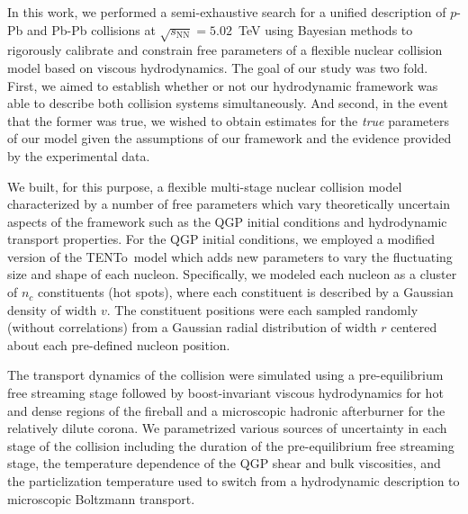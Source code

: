 \documentclass[aps,prc,reprint,amsmath,nofootinbib]{revtex4-1}
\newcommand{\trento}{T\raisebox{-0.5ex}{R}ENTo}
\newcommand{\sqrts}{\sqrt{s_\mathrm{NN}}}
\begin{document}
In this work, we performed a semi-exhaustive search for a unified description of $p$-Pb and Pb-Pb collisions at $\sqrts=5.02$~TeV using Bayesian methods to rigorously calibrate and constrain free parameters of a flexible nuclear collision model based on viscous hydrodynamics.
The goal of our study was two fold.
First, we aimed to establish whether or not our hydrodynamic framework was able to describe both collision systems simultaneously.
And second, in the event that the former was true, we wished to obtain estimates for the \emph{true} parameters of our model given the assumptions of our framework and the evidence provided by the experimental data.

We built, for this purpose, a flexible multi-stage nuclear collision model characterized by a number of free parameters which vary theoretically uncertain aspects of the framework such as the QGP initial conditions and hydrodynamic transport properties.
For the QGP initial conditions, we employed a modified version of the \trento\ model \cite{Moreland:2014oya} which adds new parameters to vary the fluctuating size and shape of each nucleon.
Specifically, we modeled each nucleon as a cluster of $n_c$ constituents (hot spots), where each constituent is described by a Gaussian density of width $v$.
The constituent positions were each sampled randomly (without correlations) from a Gaussian radial distribution of width $r$ centered about each pre-defined nucleon position.

The transport dynamics of the collision were simulated using a pre-equilibrium free streaming stage followed by boost-invariant viscous hydrodynamics for hot and dense regions of the fireball and a microscopic hadronic afterburner for the relatively dilute corona.
We parametrized various sources of uncertainty in each stage of the collision including the duration of the pre-equilibrium free streaming stage, the temperature dependence of the QGP shear and bulk viscosities, and the particlization temperature used to switch from a hydrodynamic description to microscopic Boltzmann transport.
\end{document}
